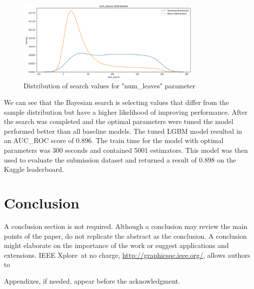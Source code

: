 \documentclass[journal,twoside,web]{ieeecolor}
\begin{document}
\begin{figure}[h!]
  \centering
  \includegraphics[width=3.6in]{project/code/results/num-leaves-distplot.png}
  \caption{Distribution of search values for "num\_leaves" parameter}
  \label{fig:lgbmtuning_numleaves}
\end{figure}

We can see that the Bayesian search is selecting values that differ from the sample distribution but have a higher likelihood of improving performance. After the search was completed and the optimal parameters were tuned the model performed better than all baseline models. The tuned LGBM model resulted in an AUC\_ROC score of 0.896. The train time for the model with optimal parameters was 300 seconds and contained 5001 estimators. This model was then used to evaluate the submission dataset and returned a result of 0.898 on the Kaggle leaderboard.




\section{Conclusion}
A conclusion section is not required. Although a conclusion may review the 
main points of the paper, do not replicate the abstract as the conclusion. A 
conclusion might elaborate on the importance of the work or suggest 
applications and extensions. 
IEEE Xplore\textregistered\ at no charge, \underline{http://graphicsqc.ieee.org/}, allows authors to 


\appendices

Appendixes, if needed, appear before the acknowledgment.


\clearpage{}
\end{document}
